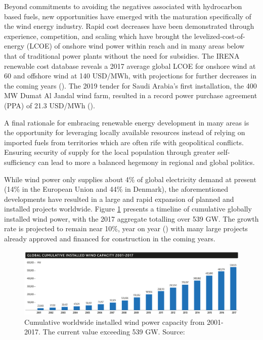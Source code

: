 Beyond commitments to avoiding the negatives associated with hydrocarbon based fuels, new opportunities have emerged with the maturation specifically of the wind energy industry. Rapid cost decreases have been demonstrated through experience, competition, and scaling which have brought the levelized-cost-of-energy (LCOE) of onshore wind power within reach and in many areas below that of traditional power plants without the need for subsidies. The IRENA renewable cost database reveals a 2017 average global LCOE for onshore wind at 60 and offshore wind at 140 USD/MWh, with projections for further decreases in the coming years (\cite{IRENA_2018}). The 2019 tender for Saudi Arabia's first installation, the 400 MW Dumat Al Jandal wind farm, resulted in a record power purchase agreement (PPA) of 21.3 USD/MWh (\cite{masdar_edf_2019}).

A final rationale for embracing renewable energy development in many areas is the opportunity for leveraging locally available resources instead of relying on imported fuels from territories which are often rife with geopolitical conflicts. Ensuring security of supply for the local population through greater self-sufficiency can lead to more a balanced hegemony in regional and global politics.

While wind power only supplies about 4\% of global electricity demand at present (14\% in the European Union and 44\% in Denmark), the aforementioned developments have resulted in a large and rapid expansion of planned and installed projects worldwide. Figure \ref{fig:wind_power_cum} presents a timeline of cumulative globally installed wind power, with the 2017 aggregate totalling over 539 GW. The growth rate is projected to remain near 10\%, year on year (\cite{gwec_global_2017}) with many large projects already approved and financed for construction in the coming years.

\begin{figure}[htbp]
    \centering
        \includegraphics[width=1.0\textwidth]{graphics/intro/motivation_market/wind_power_cum.png}
    \caption{Cumulative worldwide installed wind power capacity from 2001-2017. The current value exceeding 539 GW. Source: \cite{gwec_global_2017}}
    \label{fig:wind_power_cum}
\end{figure}

